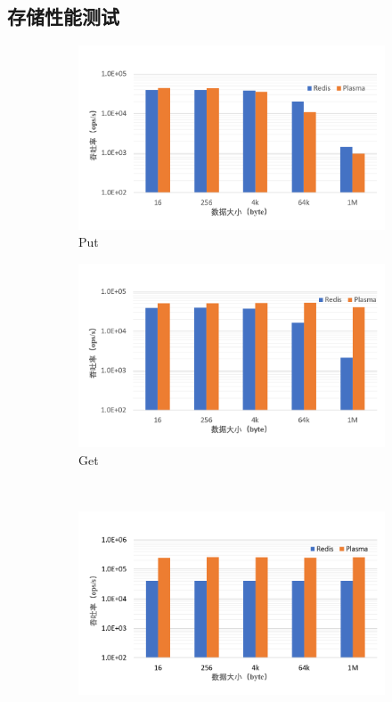 \subsection{存储性能测试}

\begin{figure}[h]
    \begin{subfigure}{0.49\textwidth}
        \includegraphics[width=\textwidth]{image/chap02/set.png}
        \caption{Put}
    \end{subfigure}
    \begin{subfigure}{0.49\textwidth}
        \includegraphics[width=\textwidth]{image/chap02/get.png}
        \caption{Get}
    \end{subfigure}
    \\
    \centering
    \begin{subfigure}{0.49\textwidth}
        \includegraphics[width=\textwidth]{image/chap02/del.png}

\end{subfigure}
\end{figure}
